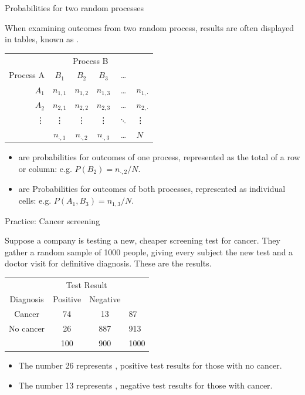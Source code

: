 \documentclass[xcolor=table, aspectratio=169, bigger]{beamer}
\begin{document}
\begin{frame}{Probabilities for two random processes}
\begin{block}{}
When examining outcomes from two random process, results are often displayed in tables, known as . \\
\pause\medskip
{\centering
\begin{tabular}{r|cccc|l}
& \multicolumn{4}{c}{Process B}\\
Process A & $B_1$ & $B_2$ & $B_3$ & \ldots \\
\hline
$A_1$ & $n_{1,1}$ & $n_{1,2}$ & $n_{1,3}$ & \ldots & $n_{1,\cdot}$ \\
$A_2$ & $n_{2,1}$ & $n_{2,2}$ & $n_{2,3}$ & \ldots & $n_{2,\cdot}$ \\
\vdots & \vdots & \vdots & \vdots & $\ddots$ & \vdots \\
\hline
& $n_{\cdot,1}$ & $n_{\cdot,2}$ & $n_{\cdot,3}$ & \ldots & $N$ \\
\end{tabular}
\par}\medskip

\begin{itemize}
\pause\item {} are probabilities for outcomes of one process, represented as the total of a row or column: e.g. $P(B_2) = n_{\cdot, 2}/N$.
\pause\item {} are Probabilities for outcomes of both processes, represented as individual cells: e.g. $P(A_1, B_3) = n_{1,3}/N$.
\end{itemize}
\end{block}

\end{frame}

\begin{frame}{Practice: Cancer screening}
\begin{block}{}
Suppose a company is testing a new, cheaper screening test for cancer. They gather a random sample of 1000 people, giving every subject the new test and a doctor visit for definitive diagnosis. These are the results.\\
\medskip
{\centering
\begin{tabular}{c | c  c | l}
\multicolumn{1}{c}{} & \multicolumn{2}{c}{Test Result}\\
Diagnosis & Positive & Negative \\
\hline
Cancer & 74 & 13 & 87\\
No cancer & 26 & 887 & 913\\
\hline
& 100 & 900 & 1000
\end{tabular}\par
}
\smallskip
\begin{itemize}
\pause
\item The number 26 represents , positive test results for those with no cancer.
\pause
\item The number 13 represents , negative test results for those with cancer.
\end{itemize}
\end{block}
\end{frame}
\end{document}
